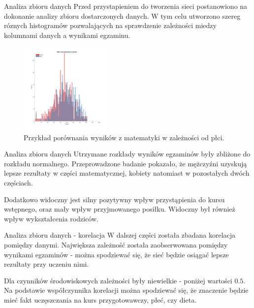 \documentclass[10pt]{beamer}
\begin{document}
\begin{frame}{Analiza zbioru danych}
Przed przystapieniem do tworzenia sieci postanowiono na dokonanie analizy zbioru dostarczonych danych. W tym celu utworzono szereg róznych histogramów pozwalających na sprawdzenie zależności miedzy kolumnami danych a wynikami egzaminu. 


\begin{figure}[H]
\centering
\includegraphics[width=0.4\textwidth]{../report/static/hist_math_score_per_gender.pdf}
\caption{Przykład porównania wyników z matematyki w zależności od płci.}
\end{figure}
\end{frame}


\begin{frame}{Analiza zbioru danych}
Utrzymane rozkłady wyników egzaminów były zbliżone do rozkładu normalnego. Przeprowadzone badanie pokazało, że mężczyźni uzyskują lepsze rezultaty w części matematycznej, kobiety natomiast w pozostałych dwóch częściach.

Dodatkowo widoczny jest silny pozytywny wpływ  przystąpienia do kursu wstępnego, oraz mały wpływ przyjmowanego posiłku. Widoczny był również wpływ wykształcenia rodziców.
\end{frame}

\begin{frame}{Analiza zbioru danych - korelacja}
W dalszej części została zbadana korelacja pomiędzy danymi. Największa zależność została zaobserwowana pomiędzy wynikami egzaminów - można spodziewać się, że sieć będzie osiągać lepsze rezultaty przy uczeniu nimi.

Dla czynników środowiskowych zależności były niewielkie - poniżej wartości $0.5$. Na podstawie współczynnika korelacji można spodziewać się, że znaczenie będzie mieć fakt uczęszczania na  kurs przygotowawczy, płeć, czy dieta.
\end{frame}
\end{document}
